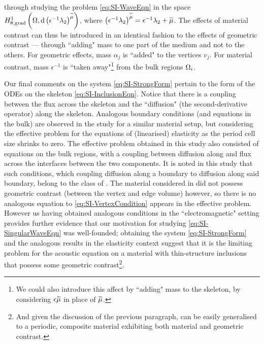 through studying the problem \eqref{eq:SI-WaveEqn} in the space $H^1_{\theta, \mathrm{grad}}\left( \Omega, \mathrm{d}\left( \epsilon^{-1}\lambda_2 \right)^{\widetilde{\mu}} \right)$, where $\left( \epsilon^{-1}\lambda_2 \right)^{\widetilde{\mu}} = \epsilon^{-1}\lambda_2 + \widetilde{\mu}$.
The effects of material contrast can thus be introduced in an identical fashion to the effects of geometric contrast --- through ``adding" mass to one part of the medium and not to the others.
For geometric effects, mass $\alpha_j$ is ``added" to the vertices $v_j$.
For material contrast, mass $\epsilon^{-1}$ is ``taken away"\footnote{We could also introduce this affect by ``adding" mass to the skeleton, by considering $\epsilon\widetilde{\mu}$ in place of $\widetilde{\mu}$.} from the bulk regions $\Omega_i$. 

Our final comments on the system \eqref{eq:SI-StrongForm} pertain to the form of the ODEs on the skeleton \eqref{eq:SI-InclusionEqn}.
Notice that there is a coupling between the flux across the skeleton and the ``diffusion" (the second-derivative operator) along the skeleton.
Analogous boundary conditions (and equations in the bulk) are observed in the study  for a similar material setup, but considering the effective problem for the equations of (linearised) elasticity as the period cell size shrinks to zero.
The effective problem obtained in this study also consisted of equations on the bulk regions, with a coupling between diffusion along and flux across the interfaces between the two components.
It is noted in this study that such conditions, which coupling diffusion along a boundary to diffusion along said boundary, belong to the class of .
The material considered in  did not possess geometric contrast (between the vertex and edge volume) however, so there is no analogous equation to \eqref{eq:SI-VertexCondition} appears in the effective problem.
However us having obtained analogous conditions in the ``electromagnetic" setting provides further evidence that our motivation for studying \eqref{eq:SI-SingularWaveEqn} was well-founded; obtaining the system \eqref{eq:SI-StrongForm} and the analogous results in the elasticity context suggest that it is the limiting problem for the acoustic equation on a material with thin-structure inclusions that possess some geometric contrast\footnote{And given the discussion of the previous paragraph, can be easily generalised to a periodic, composite material exhibiting both material and geometric contrast.}.

